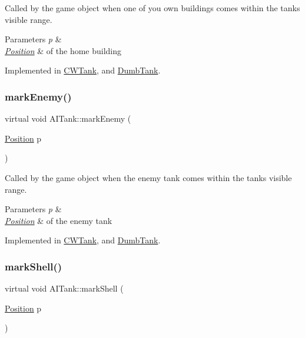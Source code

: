 Called by the game object when one of you own buildings comes within the tanks visible range. 


\begin{DoxyParams}{Parameters}
{\em p} & \\
\hline
{\em \mbox{\hyperlink{class_position}{Position}}} & of the home building \\
\hline
\end{DoxyParams}


Implemented in \mbox{\hyperlink{class_c_w_tank_aa9d187d34afdf60750da9fe184f62b75}{C\+W\+Tank}}, and \mbox{\hyperlink{class_dumb_tank_ac2c8fe2a13fe009676580b33be241f59}{Dumb\+Tank}}.

\mbox{\label{class_a_i_tank_a2bd0495cee5e50d3ef60b3d6c6c145d8}} 
\subsubsection{\texorpdfstring{mark\+Enemy()}{markEnemy()}}
{\footnotesize\ttfamily virtual void A\+I\+Tank\+::mark\+Enemy (\begin{DoxyParamCaption}\item[{\mbox{\hyperlink{class_position}{Position}}}]{p }\end{DoxyParamCaption})\hspace{0.3cm}{\ttfamily [pure virtual]}}



Called by the game object when the enemy tank comes within the tanks visible range. 


\begin{DoxyParams}{Parameters}
{\em p} & \\
\hline
{\em \mbox{\hyperlink{class_position}{Position}}} & of the enemy tank \\
\hline
\end{DoxyParams}


Implemented in \mbox{\hyperlink{class_c_w_tank_ac314256fd8738022b97b0239db6955e6}{C\+W\+Tank}}, and \mbox{\hyperlink{class_dumb_tank_a6e285a834c2f65bc559c0f08133acc3e}{Dumb\+Tank}}.

\mbox{\label{class_a_i_tank_abdf630572f1bb4afcd11a711f19a7c65}} 
\subsubsection{\texorpdfstring{mark\+Shell()}{markShell()}}
{\footnotesize\ttfamily virtual void A\+I\+Tank\+::mark\+Shell (\begin{DoxyParamCaption}\item[{\mbox{\hyperlink{class_position}{Position}}}]{p }\end{DoxyParamCaption})\hspace{0.3cm}{\ttfamily [pure virtual]}}



